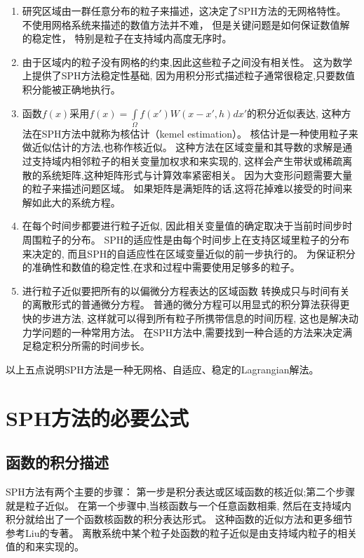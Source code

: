\begin{enumerate}
\item 研究区域由一群任意分布的粒子来描述，这决定了SPH方法的无网格特性。
不使用网格系统来描述的数值方法并不难，
但是关键问题是如何保证数值解的稳定性，
特别是粒子在支持域内高度无序时。

\item 由于区域内的粒子没有网格的约束,因此这些粒子之间没有相关性。
这为数学上提供了SPH方法稳定性基础,
因为用积分形式描述粒子通常很稳定,只要数值积分能被正确地执行。

\item 函数$f(x)$采用$f(x)=\int\limits_\Omega{}f(x')W(x-x',h)dx'$的积分近似表达,
这种方法在SPH方法中就称为核估计（kemel estimation）。
核估计是一种使用粒子来做近似估计的方法,也称作核近似。
这种方法在区域变量和其导数的求解是通过支持域内相邻粒子的相关变量加权求和来实现的,
这样会产生带状或稀疏离散的系统矩阵,这种矩阵形式与计算效率紧密相关。
因为大变形问题需要大量的粒子来描述问题区域。
如果矩阵是满矩阵的话,这将花掉难以接受的时间来解如此大的系统方程。

\item 在每个时间步都要进行粒子近似,
因此相关变量值的确定取决于当前时间步时周围粒子的分布。
SPH的适应性是由每个时间步上在支持区域里粒子的分布来决定的,
而且SPH的自适应性在区域变量近似的前一步执行的。
为保证积分的准确性和数值的稳定性,在求和过程中需要使用足够多的粒子。

\item 进行粒子近似要把所有的以偏微分方程表达的区域函数
转换成只与时间有关的离散形式的普通微分方程。
普通的微分方程可以用显式的积分算法获得更快的步进方法,
这样就可以得到所有粒子所携带信息的时间历程,
这也是解决动力学问题的一种常用方法。
在SPH方法中,需要找到一种合适的方法来决定满足稳定积分所需的时间步长。

\end{enumerate}\qquad{}
以上五点说明SPH方法是一种无网格、自适应、稳定的Lagrangian解法。

\section{SPH方法的必要公式}
\subsection{函数的积分描述}
SPH方法有两个主要的步骤：
第一步是积分表达或区域函数的核近似;第二个步骤就是粒子近似。
在第一个步骤中,当核函数与一个任意函数相乘,
然后在支持域内积分就给出了一个函数核函数的积分表达形式。
这种函数的近似方法和更多细节参考Liu的专著。
离散系统中某个粒子处函数的粒子近似是由支持域内粒子的相关值的和来实现的。

